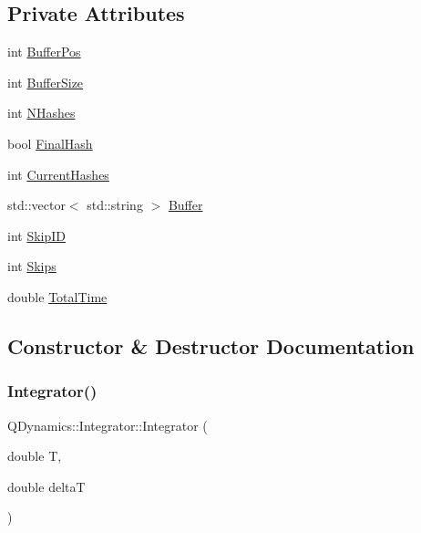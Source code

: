 \subsection*{Private Attributes}
\begin{DoxyCompactItemize}
\item 
int \hyperlink{classQDynamics_1_1Integrator_ae62176188110c0dcea7c65ba429d1abe}{Buffer\+Pos}
\item 
int \hyperlink{classQDynamics_1_1Integrator_acbafc2a1b2b19f230c6dfd8924cb36dd}{Buffer\+Size}
\item 
int \hyperlink{classQDynamics_1_1Integrator_a00be60876ae62ef0d1555a6cc0ce52a5}{N\+Hashes}
\item 
bool \hyperlink{classQDynamics_1_1Integrator_ae893dd6b0d041de777e25a99f42886c3}{Final\+Hash}
\item 
int \hyperlink{classQDynamics_1_1Integrator_abab707f49ba0ae6701db5dbcdf86861f}{Current\+Hashes}
\item 
std\+::vector$<$ std\+::string $>$ \hyperlink{classQDynamics_1_1Integrator_af8889c2bbe10237a8dd8c46b25b15d29}{Buffer}
\item 
int \hyperlink{classQDynamics_1_1Integrator_a95e110d6b14003db39f8a52180b97870}{Skip\+ID}
\item 
int \hyperlink{classQDynamics_1_1Integrator_a409e18faeeefa5fb63f7bcce3eb0e381}{Skips}
\item 
double \hyperlink{classQDynamics_1_1Integrator_addfb67b6faa62d88bc7234d5496aeaf9}{Total\+Time}
\end{DoxyCompactItemize}


\subsection{Constructor \& Destructor Documentation}
\mbox{\label{classQDynamics_1_1Integrator_a677dd555cee316d6d456b7da258c4385}} 
\subsubsection{\texorpdfstring{Integrator()}{Integrator()}\hspace{0.1cm}{\footnotesize\ttfamily [1/2]}}
{\footnotesize\ttfamily Q\+Dynamics\+::\+Integrator\+::\+Integrator (\begin{DoxyParamCaption}\item[{double}]{T,  }\item[{double}]{deltaT }\end{DoxyParamCaption})\hspace{0.3cm}{\ttfamily [inline]}}

